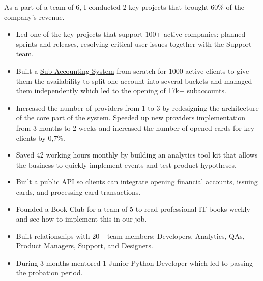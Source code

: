 As a part of a team of 6, I conducted 2 key projects that brought 60\% of the company’s revenue.

\begin{itemize}
    \item Led one of the key projects that support 100+ active companies: planned sprints and releases, resolving critical user issues together with the Support team.
    \item Built a \href{https://www.ajot.com/news/karta.io-introduces-a-new-sub-accounts-feature-delivering-an-advanced-money-flow-operation}{\underline{Sub Accounting System}} from scratch for 1000 active clients to give them the availability to split one account into several buckets and managed them independently which led to the opening of 17k+ subaccounts.
    \item Increased the number of providers from 1 to 3 by redesigning the architecture of the core part of the system. Speeded up new providers implementation from 3 months to 2 weeks and increased the number of opened cards for key clients by 0,7\%.
    \item Saved 42 working hours monthly by building an analytics tool kit that allows the business to quickly implement events and test product hypotheses.
    \item Built a \href{https://karta.io/blog/21-meet-karta-api-growth-engine-for-your-business}{\underline{public API}} so clients can integrate opening financial accounts, issuing cards, and processing card transactions.
    \item Founded a Book Club for a team of 5 to read professional IT books weekly and see how to implement this in our job.
    \item Built relationships with 20+ team members: Developers, Analytics, QAs, Product Managers, Support, and Designers.
    \item During 3 months mentored 1 Junior Python Developer which led to passing the probation period.
\end{itemize}

